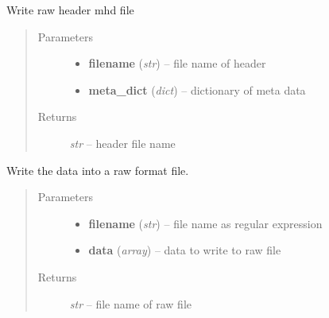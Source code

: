\documentclass[letterpaper,10pt,english]{sphinxmanual}
\begin{document}

\begin{fulllineitems}
\label{api/ClearMap.IO:ClearMap.IO.RAW.writeHeader}
Write raw header mhd file
\begin{quote}\begin{description}
\item[{Parameters}] \leavevmode\begin{itemize}
\item {} 
\textbf{filename} (\emph{str}) --
file name of header

\item {} 
\textbf{meta\_dict} (\emph{dict}) --
dictionary of meta data

\end{itemize}

\item[{Returns}] \leavevmode
\emph{str} --
header file name

\end{description}\end{quote}

\end{fulllineitems}


\begin{fulllineitems}
\label{api/ClearMap.IO:ClearMap.IO.RAW.writeRawData}
Write the data into a raw format file.
\begin{quote}\begin{description}
\item[{Parameters}] \leavevmode\begin{itemize}
\item {} 
\textbf{filename} (\emph{str}) --
file name as regular expression

\item {} 
\textbf{data} (\emph{array}) --
data to write to raw file

\end{itemize}

\item[{Returns}] \leavevmode
\emph{str} --
file name of raw file

\end{description}\end{quote}

\end{fulllineitems}
\end{document}
